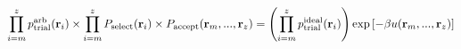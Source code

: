 \documentclass[12pt]{article}
\begin{document}
\begin{displaymath}
\prod_{i=m}^{z} p_{\rm trial}^{\rm arb}({\bf r}_i) \times
\prod_{i=m}^{z} P_{\rm select}({\bf r}_i) \times
P_{\rm accept} ({\bf r}_m, ..., {\bf r}_z)
=
\left(\prod_{i=m}^{z} p_{\rm trial}^{\rm ideal}({\bf r}_i)\right) \exp\left[-\beta u({\bf r}_m, ..., {\bf r}_z)\right]
\end{displaymath}
\end{document}
